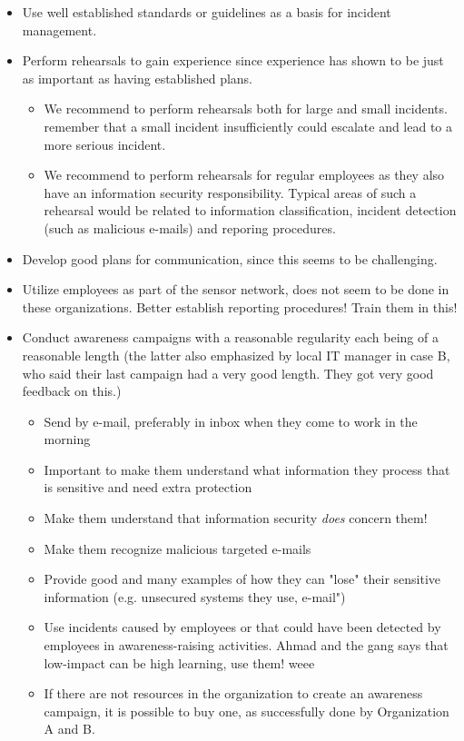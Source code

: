 \begin{itemize}
\item Use well established standards or guidelines as a basis for incident management.
\item Perform rehearsals to gain experience since experience has shown to be just as important as having established plans.
\begin{itemize}
\item We recommend to perform rehearsals both for large and small incidents. remember that a small incident insufficiently could escalate and lead to a more serious incident.
\item We recommend to perform rehearsals for regular employees as they also have an information security responsibility. Typical areas of such a rehearsal would be related to information classification, incident detection (such as malicious e-mails) and reporing procedures. 
\end{itemize}
\item Develop good plans for communication, since this seems to be challenging.
\item Utilize employees as part of the sensor network, does not seem to be done in these organizations. Better establish reporting procedures! Train them in this!
\item Conduct awareness campaigns with a reasonable regularity each being of a reasonable length (the latter also emphasized by local IT manager in case B, who said their last campaign had a very good length. They got very good feedback on this.)
\begin{itemize}
\item Send by e-mail, preferably in inbox when they come to work in the morning
\item Important to make them understand what information they process that is sensitive and need extra protection
\item Make them understand that information security \textit{does} concern them!
\item Make them recognize malicious targeted e-mails
\item Provide good and many examples of how they can "lose" their sensitive information (e.g. unsecured systems they use, e-mail")
\item Use incidents caused by employees or that could have been detected by employees in awareness-raising activities. Ahmad and the gang says that low-impact can be high learning, use them! weee
\item If there are not resources in the organization to create an awareness campaign, it is possible to buy one, as successfully done by Organization A and B.
\end{itemize}
\end{itemize}

